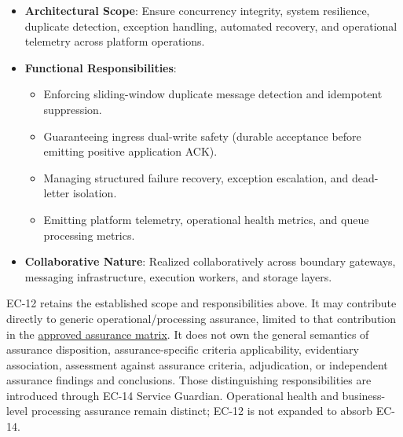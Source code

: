 
\begin{itemize}

\item
\textbf{Architectural Scope}: Ensure concurrency integrity, system resilience, duplicate detection, exception handling, automated recovery, and operational telemetry across platform operations.



\item
\textbf{Functional Responsibilities}:


\begin{itemize}

\item
Enforcing sliding-window duplicate message detection and idempotent suppression.



\item
Guaranteeing ingress dual-write safety (durable acceptance before emitting positive application ACK).



\item
Managing structured failure recovery, exception escalation, and dead-letter isolation.



\item
Emitting platform telemetry, operational health metrics, and queue processing metrics.



\end{itemize}


\item
\textbf{Collaborative Nature}: Realized collaboratively across boundary gateways, messaging infrastructure, execution workers, and storage layers.



\end{itemize}

EC-12 retains the established scope and responsibilities above. It may contribute directly to generic operational/\allowbreak{}processing assurance, limited to that contribution in the \href{https://github.com/fhirfactory/harmonia/blob/98410db60155198a75f74c79d98060070209faa1/docs/markdown/02-strategy/capability-maps/health-service-assurance-derivation.md\#collaborative-enterprise-capability-contribution-matrix}{approved assurance matrix}. It does not own the general semantics of assurance disposition, assurance-specific criteria applicability, evidentiary association, assessment against assurance criteria, adjudication, or independent assurance findings and conclusions. Those distinguishing responsibilities are introduced through EC-14 Service Guardian. Operational health and business-level processing assurance remain distinct; EC-12 is not expanded to absorb EC-14.


